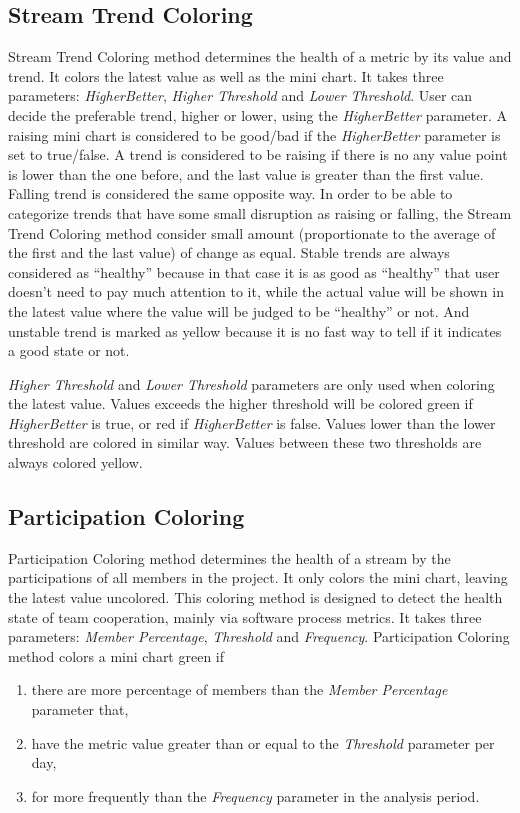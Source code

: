 \subsection{Stream Trend Coloring} 
Stream Trend Coloring method determines the health of a metric by its value and trend. It colors the latest value as well as the mini chart. It takes three parameters: {\it HigherBetter}, {\it Higher Threshold} and {\it Lower Threshold}. User can decide the preferable trend, higher or lower, using the {\it HigherBetter} parameter. A raising mini chart is considered to be good/bad if the {\it HigherBetter} parameter is set to true/false. A trend is considered to be raising if there is no any value point is lower than the one before, and the last value is greater than the first value. Falling trend is considered the same opposite way. In order to be able to categorize trends that have some small disruption as raising or falling, the Stream Trend Coloring method consider small amount (proportionate to the average of the first and the last value) of change as equal. Stable trends are always considered as ``healthy'' because in that case it is as good as ``healthy'' that user doesn't need to pay much attention to it, while the actual value will be shown in the latest value where the value will be judged to be ``healthy'' or not. And unstable trend is marked as yellow because it is no fast way to tell if it indicates a good state or not. 

{\it Higher Threshold} and {\it Lower Threshold} parameters are only used when coloring the latest value. Values exceeds the higher threshold will be colored green if {\it HigherBetter} is true, or red if {\it HigherBetter} is false. Values lower than the lower threshold are colored in similar way. Values between these two thresholds are always colored yellow.

\subsection{Participation Coloring}
Participation Coloring method determines the health of a stream by the participations of all members in the project. It only colors the mini chart, leaving the latest value uncolored. This coloring method is designed to detect the health state of team cooperation, mainly via software process metrics. It takes three parameters: {\it Member Percentage}, {\it Threshold} and {\it Frequency}. Participation Coloring method colors a mini chart green if 
\begin{enumerate}
\item there are more percentage of members than the {\it Member Percentage} parameter that,
\item have the metric value greater than or equal to the {\it Threshold} parameter per day,
\item for more frequently than the {\it Frequency} parameter in the analysis period.
\end{enumerate}

